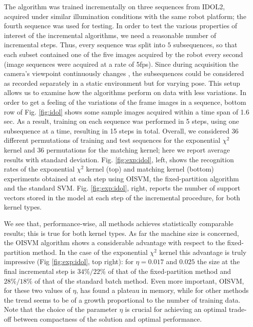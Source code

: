 The algorithm was trained incrementally on three sequences from IDOL2,
acquired under similar illumination conditions with the same robot
platform; the fourth sequence was used for testing. In order to test
the various properties of interest of the incremental algorithms, we
need a reasonable number of incremental steps.  Thus, every sequence
was split into $5$ subsequences, so that each subset contained one
of the five images acquired by the robot every second (image sequences
were acquired at a rate of 5fps). Since during acquisition the
camera's viewpoint continuously changes \cite{luo:idol2}, the
subsequences could be considered as recorded separately in a static
environment but for varying pose.  This setup allows us to examine how
the algorithms perform on data with less variations. In order to get a
feeling of the variations of the frame images in a sequence, bottom
row of Fig. \ref{fig:idol} shows some sample images acquired within a
time span of 1.6 sec. As a result, training
on each sequence was performed in 5 steps, using one subsequence at a
time, resulting in 15 steps in total. Overall, we considered 36
different permutations of training and test sequences for the
exponential $\chi^2$ kernel and 36 permutations for the matching
kernel; here we report average results with standard
deviation. Fig. \ref{fig:exp:idol}, left, shows the recognition rates
of the exponential $\chi^2$ kernel (top) and matching kernel (bottom)
experiments obtained at each step using OISVM, the fixed-partition
algorithm and the standard SVM. Fig. \ref{fig:exp:idol}, right,
reports the number of support vectors stored in the model at each step
of the incremental procedure, for both kernel types.

We see that, performance-wise, all methods achieves statistically
comparable results; this is true for both kernel types. As far the
machine size is concerned, the OISVM algorithm shows a considerable
advantage with respect to the fixed-partition method. In the case of the exponential
$\chi^{2}$ kernel this advantage is truly impressive (Fig
\ref{fig:exp:idol}, top right): for $\eta=0.017$ and $0.025$ the
size at the final incremental step is $34\%/22\%$ of that of the
fixed-partition method and $28\%/18\%$ of that of the
standard batch method. Even more important, OISVM, for these two
values of $\eta$, has found a plateau in memory, while for other
methods the trend seems to be of a growth proportional to the
number of training data. Note
that the choice of the parameter $\eta$ is crucial for achieving an
optimal trade-off between compactness of the solution and optimal
performance.


